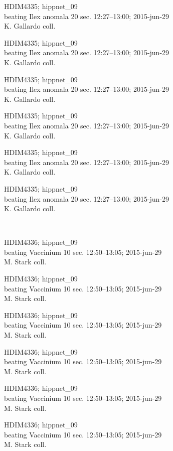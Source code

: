 \documentclass[2pt]{extarticle}
\begin{document}
\noindent
\parbox{0.16\textwidth}{\tiny \raggedright \rule[-0.3\baselineskip]{0pt}{10pt}HDIM4335; hippnet\_09\\ beating Ilex anomala 20 sec. 12:27--13:00; 2015-jun-29\\ K. Gallardo coll.}
\parbox{0.16\textwidth}{\tiny \raggedright \rule[-0.3\baselineskip]{0pt}{10pt}HDIM4335; hippnet\_09\\ beating Ilex anomala 20 sec. 12:27--13:00; 2015-jun-29\\ K. Gallardo coll.}
\parbox{0.16\textwidth}{\tiny \raggedright \rule[-0.3\baselineskip]{0pt}{10pt}HDIM4335; hippnet\_09\\ beating Ilex anomala 20 sec. 12:27--13:00; 2015-jun-29\\ K. Gallardo coll.}
\parbox{0.16\textwidth}{\tiny \raggedright \rule[-0.3\baselineskip]{0pt}{10pt}HDIM4335; hippnet\_09\\ beating Ilex anomala 20 sec. 12:27--13:00; 2015-jun-29\\ K. Gallardo coll.}
\parbox{0.16\textwidth}{\tiny \raggedright \rule[-0.3\baselineskip]{0pt}{10pt}HDIM4335; hippnet\_09\\ beating Ilex anomala 20 sec. 12:27--13:00; 2015-jun-29\\ K. Gallardo coll.}
\parbox{0.16\textwidth}{\tiny \raggedright \rule[-0.3\baselineskip]{0pt}{10pt}HDIM4335; hippnet\_09\\ beating Ilex anomala 20 sec. 12:27--13:00; 2015-jun-29\\ K. Gallardo coll.} \\ 
\vspace{0.001in} 

\noindent
\parbox{0.16\textwidth}{\tiny \raggedright \rule[-0.3\baselineskip]{0pt}{10pt}HDIM4336; hippnet\_09\\ beating Vaccinium 10 sec. 12:50--13:05; 2015-jun-29\\ M. Stark coll.}
\parbox{0.16\textwidth}{\tiny \raggedright \rule[-0.3\baselineskip]{0pt}{10pt}HDIM4336; hippnet\_09\\ beating Vaccinium 10 sec. 12:50--13:05; 2015-jun-29\\ M. Stark coll.}
\parbox{0.16\textwidth}{\tiny \raggedright \rule[-0.3\baselineskip]{0pt}{10pt}HDIM4336; hippnet\_09\\ beating Vaccinium 10 sec. 12:50--13:05; 2015-jun-29\\ M. Stark coll.}
\parbox{0.16\textwidth}{\tiny \raggedright \rule[-0.3\baselineskip]{0pt}{10pt}HDIM4336; hippnet\_09\\ beating Vaccinium 10 sec. 12:50--13:05; 2015-jun-29\\ M. Stark coll.}
\parbox{0.16\textwidth}{\tiny \raggedright \rule[-0.3\baselineskip]{0pt}{10pt}HDIM4336; hippnet\_09\\ beating Vaccinium 10 sec. 12:50--13:05; 2015-jun-29\\ M. Stark coll.}
\parbox{0.16\textwidth}{\tiny \raggedright \rule[-0.3\baselineskip]{0pt}{10pt}HDIM4336; hippnet\_09\\ beating Vaccinium 10 sec. 12:50--13:05; 2015-jun-29\\ M. Stark coll.} \\ 
\vspace{0.001in} 
\end{document}
